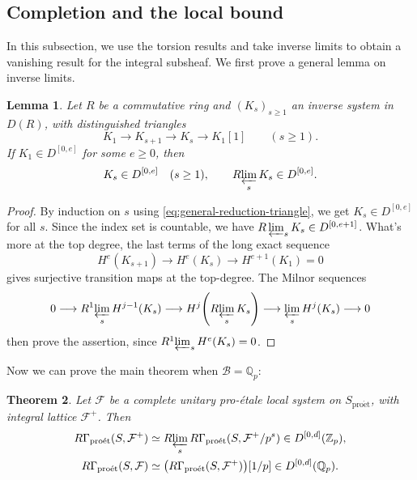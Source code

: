 \documentclass[11pt]{article}
\newtheorem{theorem}{Theorem}[section]
\newtheorem{lemma}[theorem]{Lemma}
\theoremstyle{definition}
\newcommand{\Qp}{\mathbb Q_p}
\newcommand{\Zp}{\mathbb Z_p}
\newcommand{\cF}{\mathcal F}
\newcommand{\proet}{\mathrm{pro\acute et}}
\begin{document}
\subsection{Completion and the local bound}
In this subsection, we use the torsion results and take inverse limits to obtain
a vanishing result for the integral subsheaf. We first prove a general lemma on inverse limits.
\begin{lemma}%
\label{lem:general-completion-amplitude}
Let \(R\) be a commutative ring and \((K_s)_{s\geq1}\) an inverse system
in \(D(R)\), with distinguished triangles
\begin{equation}\label{eq:general-reduction-triangle}
 K_1\longrightarrow K_{s+1}\longrightarrow K_s
 \longrightarrow K_1[1]
 \qquad(s\geq1).
\end{equation}
If \(K_1\in D^{[0,e]}\) for some \(e\geq0\), then
\[
 K_s\in D^{[0,e]}\quad(s\geq1),\qquad
 R\!\varprojlim_s K_s\in D^{[0,e]}.
\]
\end{lemma}

\begin{proof}
By induction on $s$ using \eqref{eq:general-reduction-triangle}, we get \(K_s\in D^{[0,e]}\) for all $s$.
Since the index set is countable, we have $R\varprojlim_s K_s\in D^{[0, e+1]}$. What's more at the top degree, the last terms of the long exact sequence
\[
 H^e(K_{s+1})\longrightarrow H^e(K_s)
 \longrightarrow H^{e+1}(K_1)=0
\]
gives surjective transition maps at the top-degree.  The Milnor sequences
\cite[Tag~0D6K]{Stacks}
\begin{equation}\label{eq:general-lattice-Milnor}
 0\longrightarrow R^1\!\varprojlim_s H^{j-1}(K_s)
 \longrightarrow H^j\!\left(R\!\varprojlim_s K_s\right)
 \longrightarrow\varprojlim_s H^j(K_s)\longrightarrow0
\end{equation}
then prove the assertion, since
\(R^1\!\varprojlim_s H^e(K_s)=0\).
\end{proof}

Now we can prove the main theorem when $\mathscr{B}=\mathbb{Q}_p$:
\begin{theorem}%
\label{thm:general-local-lattice-amplitude}
Let \(\mathcal F\) be a complete unitary pro-\'etale local system on $S_{\proet}$, with integral lattice $\cF^+$. 
Then
\begin{align}
 R\Gamma_{\proet}(S,\mathcal F^+)
 &\simeq R\!\varprojlim_s R\Gamma_{\proet}(S,\cF^+/p^s)
   \in D^{[0,d]}(\Zp),
 \label{eq:general-integral-local-amplitude}\\
 R\Gamma_{\proet}(S,\mathcal F)
 &\simeq\bigl(R\Gamma_{\proet}(S,\mathcal F^+)\bigr)[1/p]
   \in D^{[0,d]}(\Qp).
 \label{eq:general-rational-local-amplitude}
\end{align}
\end{theorem}
\end{document}
